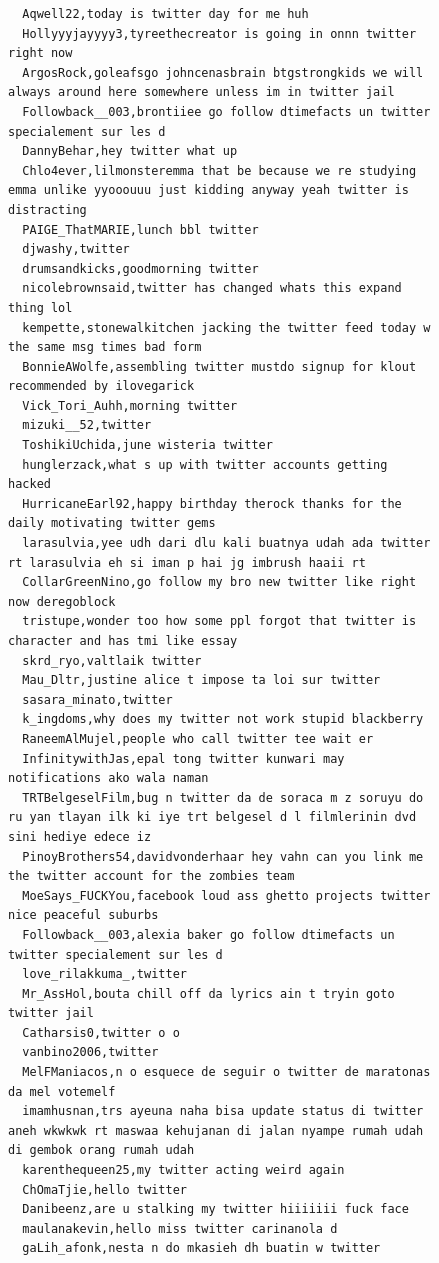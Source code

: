\begin{figure}[htpb]
\begin{verbatim}
  Aqwell22,today is twitter day for me huh
  Hollyyyjayyyy3,tyreethecreator is going in onnn twitter right now
  ArgosRock,goleafsgo johncenasbrain btgstrongkids we will always around here somewhere unless im in twitter jail
  Followback__003,brontiiee go follow dtimefacts un twitter specialement sur les d
  DannyBehar,hey twitter what up
  Chlo4ever,lilmonsteremma that be because we re studying emma unlike yyooouuu just kidding anyway yeah twitter is distracting
  PAIGE_ThatMARIE,lunch bbl twitter
  djwashy,twitter
  drumsandkicks,goodmorning twitter
  nicolebrownsaid,twitter has changed whats this expand thing lol
  kempette,stonewalkitchen jacking the twitter feed today w the same msg times bad form
  BonnieAWolfe,assembling twitter mustdo signup for klout recommended by ilovegarick
  Vick_Tori_Auhh,morning twitter
  mizuki__52,twitter
  ToshikiUchida,june wisteria twitter
  hunglerzack,what s up with twitter accounts getting hacked
  HurricaneEarl92,happy birthday therock thanks for the daily motivating twitter gems
  larasulvia,yee udh dari dlu kali buatnya udah ada twitter rt larasulvia eh si iman p hai jg imbrush haaii rt
  CollarGreenNino,go follow my bro new twitter like right now deregoblock
  tristupe,wonder too how some ppl forgot that twitter is character and has tmi like essay
  skrd_ryo,valtlaik twitter
  Mau_Dltr,justine alice t impose ta loi sur twitter
  sasara_minato,twitter
  k_ingdoms,why does my twitter not work stupid blackberry
  RaneemAlMujel,people who call twitter tee wait er
  InfinitywithJas,epal tong twitter kunwari may notifications ako wala naman
  TRTBelgeselFilm,bug n twitter da de soraca m z soruyu do ru yan tlayan ilk ki iye trt belgesel d l filmlerinin dvd sini hediye edece iz
  PinoyBrothers54,davidvonderhaar hey vahn can you link me the twitter account for the zombies team
  MoeSays_FUCKYou,facebook loud ass ghetto projects twitter nice peaceful suburbs
  Followback__003,alexia baker go follow dtimefacts un twitter specialement sur les d
  love_rilakkuma_,twitter
  Mr_AssHol,bouta chill off da lyrics ain t tryin goto twitter jail
  Catharsis0,twitter o o
  vanbino2006,twitter
  MelFManiacos,n o esquece de seguir o twitter de maratonas da mel votemelf
  imamhusnan,trs ayeuna naha bisa update status di twitter aneh wkwkwk rt maswaa kehujanan di jalan nyampe rumah udah di gembok orang rumah udah
  karenthequeen25,my twitter acting weird again
  ChOmaTjie,hello twitter
  Danibeenz,are u stalking my twitter hiiiiiii fuck face
  maulanakevin,hello miss twitter carinanola d
  gaLih_afonk,nesta n do mkasieh dh buatin w twitter

\end{verbatim}
\end{figure}
